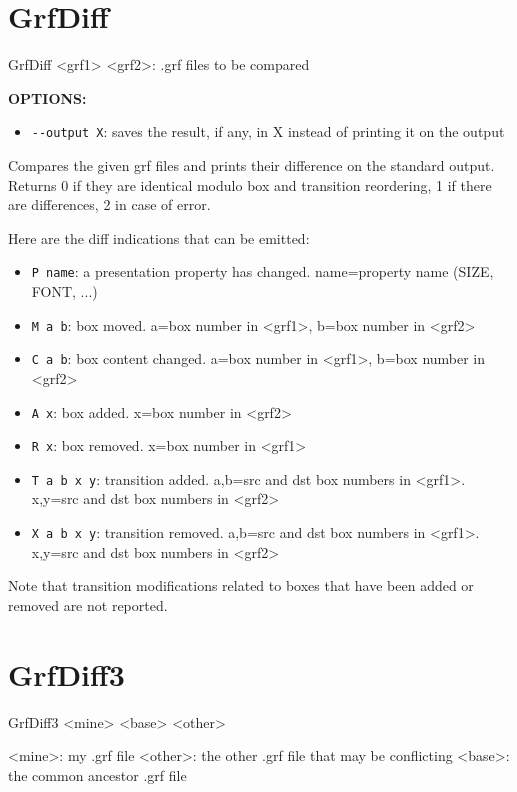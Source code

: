 \section{GrfDiff}
		GrfDiff <grf1> <grf2>: .grf files to be compared

\noindent \textbf{OPTIONS:}
\begin{itemize}
  \item \verb+--output X+: saves the result, if any, in X instead of printing it on the output
\end{itemize}
         
         Compares the given grf files and prints their difference on the standard output. 
         Returns 0 if they are identical modulo box and transition reordering, 1 if there
		 are differences, 2 in case of error.
		 
		 Here are the diff indications that can be emitted:
\begin{itemize}
		 
		 \item \verb+P name+: a presentation property has changed. name=property name (SIZE, FONT, ...)
		 \item \verb+M a b+:  box moved. a=box number in <grf1>, b=box number in <grf2>
		 \item \verb+C a b+:  box content changed. a=box number in <grf1>, b=box number in <grf2>
		 \item \verb+A x+:    box added. x=box number in <grf2>
		 \item \verb+R x+:    box removed. x=box number in <grf1>
		 \item \verb+T a b x y+: transition added. a,b=src and dst box numbers in <grf1>. x,y=src and dst box numbers in <grf2>
		 \item \verb+X a b x y+: transition removed. a,b=src and dst box numbers in <grf1>. x,y=src and dst box numbers in <grf2>
\end{itemize}
		 
		 Note that transition modifications related to boxes that have been added or removed are not reported.





\section{GrfDiff3}
GrfDiff3 <mine> <base> <other>

  <mine>: my .grf file
  <other>: the other .grf file that may be conflicting
  <base>: the common ancestor .grf file

